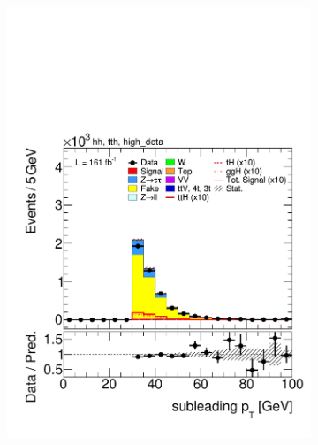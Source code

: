 \begin{figure}[htbp]
      \begin{subfigure}[b]{0.45\textwidth}
        \centering
        \includegraphics[width=\textwidth]{images/using_highdeta_ffs_run3_inclusive_withscaling/plot_tau_1_pt_hh_tth_22_23_24_high_deta.pdf}
        \caption{}
      \end{subfigure}
      \hfill
      \begin{subfigure}[b]{0.45\textwidth}
        \centering

\end{subfigure}
\end{figure}
